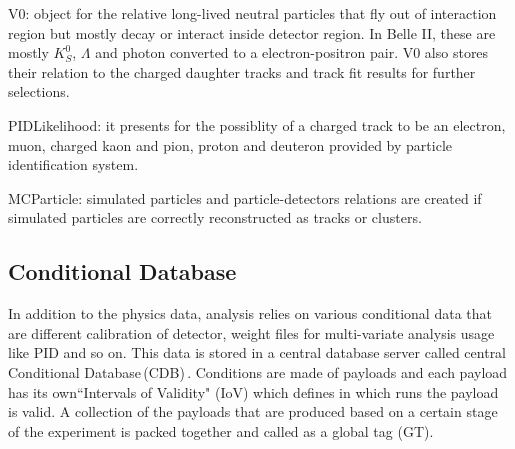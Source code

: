 \textbullet \space V0: object for the relative long-lived neutral particles that fly out of interaction region but mostly decay or interact inside detector region. In Belle II, these are mostly $K_S^0$, $\Lambda$ and photon converted to a electron-positron pair. V0 also stores their relation to the charged daughter tracks and track fit results for further selections.


\textbullet \space PIDLikelihood: it presents for the possiblity of a charged track to be an electron, muon, charged kaon and pion, proton and deuteron provided by particle identification system. 

\begin{comment}
\textbullet \space ECLCluster: reconstructed cluster in ECL detector. It consists of energy deposition and hit positions as well as other hit shape related variables. If a cluster is matched with an extrapolated track, a relation between them will also be created. 

\textbullet \space Reconstructed cluster KLM detector. It consists of momentum and position measurement. If a cluster is matched with an extrapolated track, a relation between them will also be created. 

\textbullet \space KLId: $K_L^0$ candidates with the particle identification as related to KLM and ECL clusters. 

\textbullet \space TRGSummary: L1 trigger information. 

\textbullet \space SoftwareTriggerResult: HLT information mapped by trigger names to trigger results. 
\end{comment}

\textbullet \space  MCParticle: simulated particles and particle-detectors relations are
created if simulated particles are correctly reconstructed as
tracks or clusters.
 

\subsection{Conditional Database}

In addition to the physics data, analysis relies on various conditional data that are different calibration of detector, weight files for multi-variate analysis usage like PID and so on. This data is stored in a central database server called central Conditional Database\,(CDB)\,\cite{BASF2}. 
Conditions are made of payloads and each payload has its own``Intervals of Validity" (IoV) which defines in which runs the payload is valid. A collection of the payloads that are produced based on a certain stage of the experiment is packed together and called as a global tag (GT). 
\begin{comment}
A set of payloads and IoVs are called a global tag (GT). Considered the GT that is required by the different analysis purposes may change even though the experiment condition is still same, GT is subjected to be updated once new calibrations of detectors or weight files for analysis tools are available.
\end{comment}


